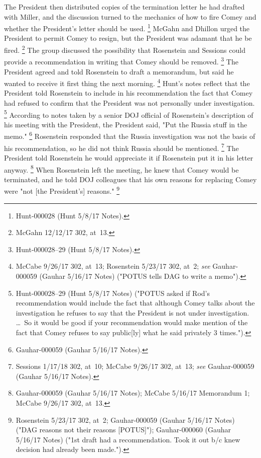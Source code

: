 The President then distributed copies of the termination letter he had drafted with Miller, and the discussion turned to the mechanics of how to fire Comey and whether the President's letter should be used.%
\footnote{Hunt-000028 (Hunt 5/8/17 Notes).}
McGahn and Dhillon urged the President to permit Comey to resign, but the President was adamant that he be fired.%
\footnote{McGahn 12/12/17 302, at~13.}
The group discussed the possibility that Rosenstein and Sessions could provide a recommendation in writing that Comey should be removed.%
\footnote{Hunt-000028--29 (Hunt 5/8/17 Notes).}
The President agreed and told Rosenstein to draft a memorandum, but said he wanted to receive it first thing the next morning.%
\footnote{McCabe 9/26/17 302, at~13;
Rosenstein 5/23/17 302, at~2;
\textit{see} Gauhar-000059 (Gauhar 5/16/17 Notes) ("POTUS tells DAG to write a memo").}
Hunt's notes reflect that the President told Rosenstein to include in his recommendation the fact that Comey had refused to confirm that the President was not personally under investigation.%
\footnote{Hunt-000028--29 (Hunt 5/8/17 Notes) ("POTUS asked if Rod's recommendation would include the fact that although Comey talks about the investigation he refuses to say that the President is not under investigation.
\dots~So it would be good if your recommendation would make mention of the fact that Comey refuses to say public[ly] what he said privately 3 times.").}
According to notes taken by a senior DOJ official of Rosenstein's description of his meeting with the President, the President said, "Put the Russia stuff in the memo."%
\footnote{Gauhar-000059 (Gauhar 5/16/17 Notes).}
Rosenstein responded that the Russia investigation was not the basis of his recommendation, so he did not think Russia should be mentioned.%
\footnote{Sessions 1/17/18 302, at~10;
McCabe 9/26/17 302, at~13;
\textit{see} Gauhar-000059 (Gauhar 5/16/17 Notes).}
The President told Rosenstein he would appreciate it if Rosenstein put it in his letter anyway.%
\footnote{Gauhar-000059 (Gauhar 5/16/17 Notes);
McCabe 5/16/17 Memorandum 1;
McCabe 9/26/17 302, at~13.}
When Rosenstein left the meeting, he knew that Comey would be terminated, and he told DOJ colleagues that his own reasons for replacing Comey were "not [the President's] reasons."%
\footnote{Rosenstein 5/23/17 302, at~2;
Gauhar-000059 (Gauhar 5/16/17 Notes) ("DAG reasons not their reasons [POTUS]");
Gauhar-000060 (Gauhar 5/16/17 Notes) ("1st draft had a recommendation.
Took it out b/c knew decision had already been made.").}

